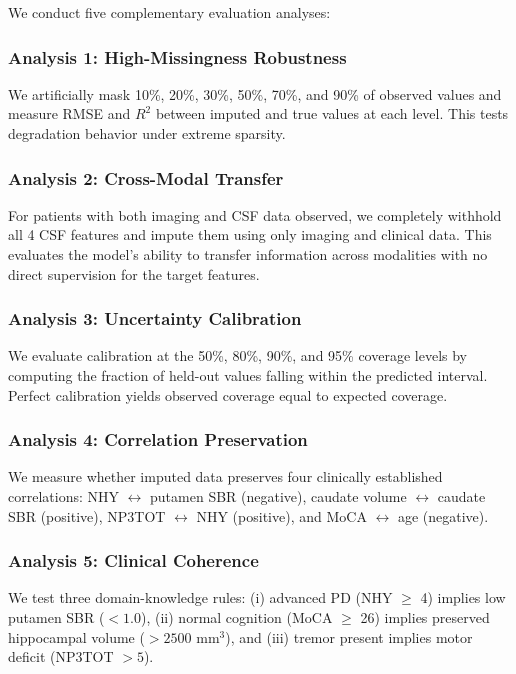 \documentclass[journal,twoside,web]{ieeecolor}
\begin{document}
We conduct five complementary evaluation analyses:

\subsubsection{Analysis 1: High-Missingness Robustness}
We artificially mask 10\%, 20\%, 30\%, 50\%, 70\%, and 90\% of observed values and measure RMSE and $R^2$ between imputed and true values at each level. This tests degradation behavior under extreme sparsity.

\subsubsection{Analysis 2: Cross-Modal Transfer}
For patients with both imaging and CSF data observed, we completely withhold all 4 CSF features and impute them using only imaging and clinical data. This evaluates the model's ability to transfer information across modalities with no direct supervision for the target features.

\subsubsection{Analysis 3: Uncertainty Calibration}
We evaluate calibration at the 50\%, 80\%, 90\%, and 95\% coverage levels by computing the fraction of held-out values falling within the predicted interval. Perfect calibration yields observed coverage equal to expected coverage.

\subsubsection{Analysis 4: Correlation Preservation}
We measure whether imputed data preserves four clinically established correlations: NHY $\leftrightarrow$ putamen SBR (negative), caudate volume $\leftrightarrow$ caudate SBR (positive), NP3TOT $\leftrightarrow$ NHY (positive), and MoCA $\leftrightarrow$ age (negative).

\subsubsection{Analysis 5: Clinical Coherence}
We test three domain-knowledge rules: (i) advanced PD (NHY $\geq$ 4) implies low putamen SBR ($< 1.0$), (ii) normal cognition (MoCA $\geq$ 26) implies preserved hippocampal volume ($> 2500$ mm$^3$), and (iii) tremor present implies motor deficit (NP3TOT $> 5$).
\end{document}
